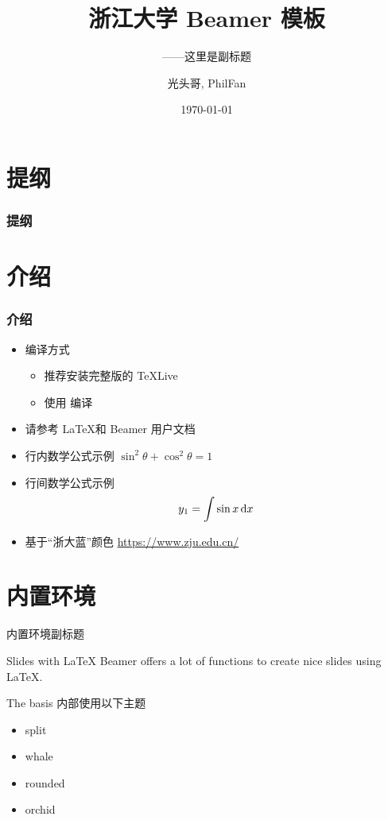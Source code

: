 \documentclass[10pt,aspectratio=169,mathserif]{beamer}
\title[浙江大学 Beamer 模板]{浙江大学 Beamer 模板}
\subtitle{——这里是副标题}
\author[Guang Touge, PhilFan]{光头哥, PhilFan}
\institute[IOPP]{计算机学院 \\ 浙江大学}
\date{\today}
\begin{document}
\begin{frame}
	\titlepage
\end{frame}				%

\section{提纲}
\begin{frame}
	\frametitle{提纲}
	\tableofcontents
\end{frame}				%

\section{介绍}
\begin{frame}
	\frametitle{介绍}

	\begin{itemize}
		\item {编译方式}
		      \begin{itemize}
			      \item  推荐安装完整版的 TeXLive
			      \item 使用 \XeLaTeX 编译
		      \end{itemize}
		\item 请参考 \LaTeX 和 Beamer 用户文档

		\item 行内数学公式示例 $\sin^2 \theta + \cos^2 \theta = 1$
		\item {行间数学公式示例 \begin{equation}
			      y_{1}=\int \sin x\, {\rm d}x
		      \end{equation}	 }
		\item 基于“浙大蓝”颜色 \url{https://www.zju.edu.cn/}
	\end{itemize}
\end{frame}

\section{内置环境}
\begin{frame}{内置环境}{副标题}
	\begin{block}{Slides with \LaTeX}
		Beamer offers a lot of functions to create nice slides using \LaTeX.
	\end{block}

	\begin{block}{The basis}
		内部使用以下主题
		\begin{itemize}
			\item split
			\item whale
			\item rounded
			\item orchid
		\end{itemize}
	\end{block}
\end{frame}
\end{document}
